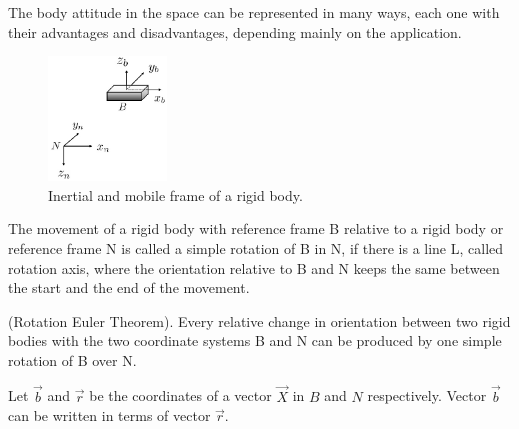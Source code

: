  The body attitude in the space can be represented in many ways, each one with their advantages and disadvantages, depending mainly on the application.
 \begin{figure}[H]
     \centering
     \includegraphics[width =0.28\textwidth]{figures/inertial_fixed.png}
     \caption{Inertial and mobile frame of a rigid body.}
     \label{fig:inertial_fixed}
   \end{figure}

 \begin{definition}
 The movement of a rigid body with reference frame B relative to a rigid body or reference frame N is called a simple rotation of B in N, if there is a line L, called rotation axis, where the orientation relative to B and N keeps the same between the start and the end of the movement.
 \end{definition}
 \begin{theorem}
    (Rotation Euler Theorem). Every relative change in orientation between two rigid bodies with the two coordinate systems B and N can be produced by one simple rotation of B over N.
 \end{theorem}
 Let $\vec{b}$ and $\vec{r}$ be the coordinates of a vector $\vec{X}$ in $B$ and $N$ respectively. Vector $\vec{b}$ can be written in terms of vector $\vec{r}$.

